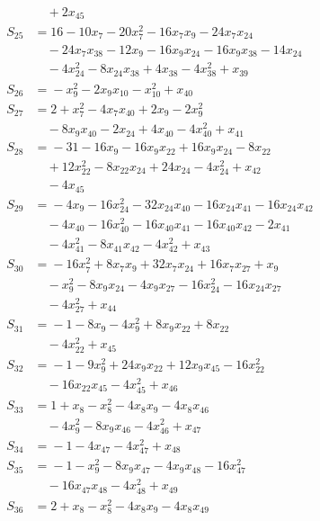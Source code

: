 \begin{align*}
&\quad{} +2x_{45} \\
S_{25} &={} 16 -10x_{7} -20x_{7}^{2} -16x_{7}x_{9} -24x_{7}x_{24} \\
&\quad{} -24x_{7}x_{38} -12x_{9} -16x_{9}x_{24} -16x_{9}x_{38} -14x_{24} \\
&\quad{} -4x_{24}^{2} -8x_{24}x_{38} +4x_{38} -4x_{38}^{2} +x_{39} \\
S_{26} &={} -x_{9}^{2} -2x_{9}x_{10} -x_{10}^{2} +x_{40} \\
S_{27} &={} 2 +x_{7}^{2} -4x_{7}x_{40} +2x_{9} -2x_{9}^{2} \\
&\quad{} -8x_{9}x_{40} -2x_{24} +4x_{40} -4x_{40}^{2} +x_{41} \\
S_{28} &={} -31 -16x_{9} -16x_{9}x_{22} +16x_{9}x_{24} -8x_{22} \\
&\quad{} +12x_{22}^{2} -8x_{22}x_{24} +24x_{24} -4x_{24}^{2} +x_{42} \\
&\quad{} -4x_{45} \\
S_{29} &={} -4x_{9} -16x_{24}^{2} -32x_{24}x_{40} -16x_{24}x_{41} -16x_{24}x_{42} \\
&\quad{} -4x_{40} -16x_{40}^{2} -16x_{40}x_{41} -16x_{40}x_{42} -2x_{41} \\
&\quad{} -4x_{41}^{2} -8x_{41}x_{42} -4x_{42}^{2} +x_{43} \\
S_{30} &={} -16x_{7}^{2} +8x_{7}x_{9} +32x_{7}x_{24} +16x_{7}x_{27} +x_{9} \\
&\quad{} -x_{9}^{2} -8x_{9}x_{24} -4x_{9}x_{27} -16x_{24}^{2} -16x_{24}x_{27} \\
&\quad{} -4x_{27}^{2} +x_{44} \\
S_{31} &={} -1 -8x_{9} -4x_{9}^{2} +8x_{9}x_{22} +8x_{22} \\
&\quad{} -4x_{22}^{2} +x_{45} \\
S_{32} &={} -1 -9x_{9}^{2} +24x_{9}x_{22} +12x_{9}x_{45} -16x_{22}^{2} \\
&\quad{} -16x_{22}x_{45} -4x_{45}^{2} +x_{46} \\
S_{33} &={} 1 +x_{8} -x_{8}^{2} -4x_{8}x_{9} -4x_{8}x_{46} \\
&\quad{} -4x_{9}^{2} -8x_{9}x_{46} -4x_{46}^{2} +x_{47} \\
S_{34} &={} -1 -4x_{47} -4x_{47}^{2} +x_{48} \\
S_{35} &={} -1 -x_{9}^{2} -8x_{9}x_{47} -4x_{9}x_{48} -16x_{47}^{2} \\
&\quad{} -16x_{47}x_{48} -4x_{48}^{2} +x_{49} \\
S_{36} &={} 2 +x_{8} -x_{8}^{2} -4x_{8}x_{9} -4x_{8}x_{49} \\

\end{align*}
